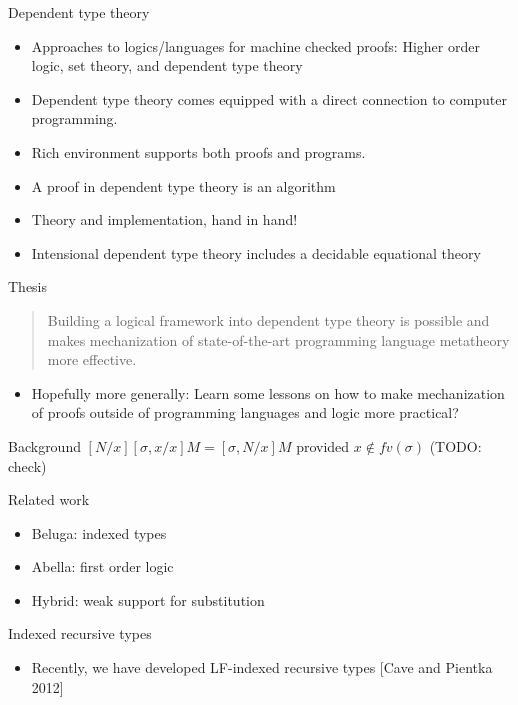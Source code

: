 \documentclass[usenames,dvipsnames]{beamer}
\begin{document}
\begin{frame}{Dependent type theory}
\begin{itemize}
\item Approaches to logics/languages for
machine checked proofs: Higher order logic, set theory, and dependent
type theory
\item Dependent type theory comes equipped with a direct
connection to computer programming.
\item Rich environment supports both proofs and
programs.
\item A proof in dependent type theory is an algorithm
\item Theory and implementation, hand in hand!
\item Intensional dependent type theory includes a decidable equational theory
\end{itemize}
\end{frame}

\begin{frame}{Thesis}
\begin{quote}Building a logical framework into dependent type
theory is possible and makes mechanization of state-of-the-art programming
language metatheory more effective.
\end{quote}
\begin{itemize}
\pause
\item Hopefully more generally: Learn some lessons on how
to make mechanization of proofs outside of programming languages and
logic more practical?
\end{itemize}
\end{frame}

\begin{frame}{Background}
$[N/x][\sigma,x/x]M = [\sigma,N/x]M$ provided $x \not\in fv(\sigma)$ (TODO: check)
\end{frame}

\begin{frame}{Related work}
\begin{itemize}
\item Beluga: indexed types
\item Abella: first order logic
\item Hybrid: weak support for substitution
\end{itemize}
\end{frame}

\begin{frame}{Indexed recursive types}
\begin{itemize}
\item Recently, we have developed LF-indexed recursive types
[Cave and Pientka 2012]
\end{itemize}
\end{frame}
\end{document}
